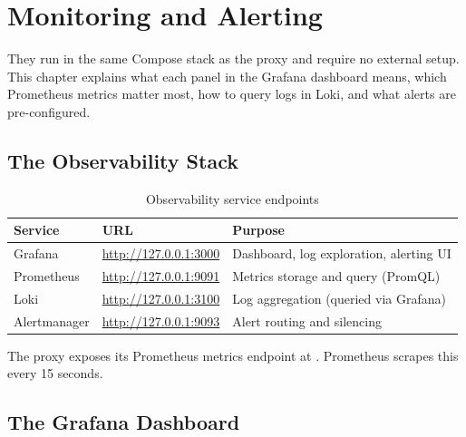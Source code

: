 
\chapter{Monitoring and Alerting}
\label{ch:monitoring}

They run in the same Compose stack as the proxy and require no external setup.
This chapter explains what each panel in the Grafana dashboard means, which
Prometheus metrics matter most, how to query logs in Loki, and what alerts are
pre-configured.

\section{The Observability Stack}

\begin{table}[ht]
  \small
  \begin{tabularx}{\linewidth}{llX}
    \toprule
    \textbf{Service} & \textbf{URL} & \textbf{Purpose} \\
    \midrule
    Grafana & \url{http://127.0.0.1:3000} & Dashboard, log exploration, alerting UI \\
    Prometheus & \url{http://127.0.0.1:9091} & Metrics storage and query (PromQL) \\
    Loki & \url{http://127.0.0.1:3100} & Log aggregation (queried via Grafana) \\
    Alertmanager & \url{http://127.0.0.1:9093} & Alert routing and silencing \\
    \bottomrule
  \end{tabularx}
  \caption{Observability service endpoints}
\end{table}

The proxy exposes its Prometheus metrics endpoint at .
Prometheus scrapes this every 15 seconds.

\section{The Grafana Dashboard}

